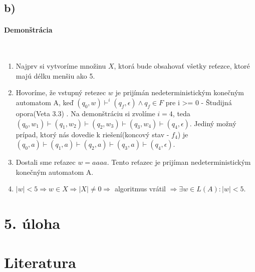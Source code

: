 \documentclass[11pt,a4paper]{article}
\begin{document}
\subsection{b)}

\paragraph{Demonštrácia}\mbox{{}}\\
\begin{enumerate}
  \item Najprv si vytvoríme množinu $X$, ktorá bude obsahovať všetky reťezce, ktoré majú délku menšiu ako 5.

  \item Hovoríme, že vstupný retezec $w$ je prijímán nedeterministickým konečným automatom A, keď  $(q_0, w) \vdash^i (q_f,\epsilon) \land q_f \in F$ pre i >= 0 - Študijná opora(Veta 3.3) \cite{AA}.
Na demonštráciu si zvolíme $i = 4$, teda $(q_0, w_1) \vdash (q_1, w_2) \vdash (q_2, w_3) \vdash (q_3, w_4) \vdash (q_4, \epsilon)$. Jediný možný prípad, ktorý nás dovedie k riešení(koncový stav - $f_4$)
je $(q_0, a) \vdash (q_1, a) \vdash (q_2, a) \vdash (q_3, a) \vdash (q_4, \epsilon)$.

  \item Dostali sme reťazec $w = aaaa$. Tento reťazec je prijíman nedeterministickým konečným automatom A.
  \item $|w| < 5 \Rightarrow w \in X \Rightarrow |X| \ne 0 \Rightarrow$ algoritmus vrátil  $\Rightarrow \exists w \in L(A) : |w| < 5$.
\end{enumerate}


\newpage
\section{5. úloha}

\newpage

\section{Literatura}

\begin{flushleft}
    
    \end{flushleft}
\end{document}
